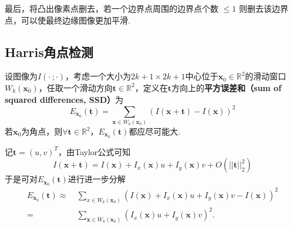 \documentclass[12pt, a4paper, oneside]{ctexart}
\numberwithin{equation}{section}  %
\def\bd{\boldsymbol}        %
\def\R{\mathbb{R}}          %
\begin{document}
最后，将凸出像素点删去，若一个边界点周围的边界点个数 \(\leqslant 1\)
则删去该边界点，可以使最终边缘图像更加平滑.

\subsection{Harris角点检测}
设图像为$I(\cdot\, ;\cdot)$，考虑一个大小为$2k+1\times 2k+1$中心位于$\bd{x}_0\in\R^2$的滑动窗口$W_k(\bd{x}_0)$，任取一个滑动方向$\bd{t}\in\R^2$，定义在$\bd{t}$方向上的\textbf{平方误差和（sum of squared differences, SSD）}为
\begin{equation*}
    E_{\bd{x}_0}(\bd{t}) = \sum_{\bd{x}\in W_k(\bd{x}_0)}\left(I(\bd{x}+\bd{t})-I(\bd{x})\right)^2
\end{equation*}
若$\bd{x}_0$为角点，则$\forall \bd{t}\in\R^2$，$E_{\bd{x}_0}(\bd{t})$都应尽可能大.

记$\bd{t} = (u,v)^T$，由Taylor公式可知
\begin{equation*}
    I(\bd{x} + \bd{t}) = I(\bd{x}) + I_x(\bd{x})u+I_y(\bd{x})v+O(||\bd{t}||_2^2)
\end{equation*}
于是可对$E_{\bd{x}_0}(\bd{t})$进行进一步分解
\begin{align*}
    E_{\bd{x}_0}(\bd{t})\approx&\  \sum_{x\in W_k(\bd{x}_0)}\left(I(\bd{x}) + I_x(\bd{x})u+I_y(\bd{x})v-I(\bd{x})\right)^2\\
    =&\ \sum_{\bd{x}\in W_k(\bd{x}_0)}\left(I_x(\bd{x})u+I_y(\bd{x})v\right)^2.
\end{align*}
\end{document}
